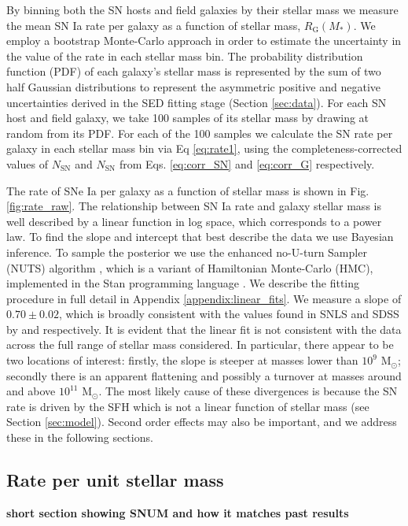 \documentclass[fleqn,usenatbib]{mnras}
\begin{document}
By binning both the SN hosts and field galaxies by their stellar mass we measure the mean SN Ia rate per galaxy as a function of stellar mass, $R_{\mathrm{G}}(M_*)$. We employ a bootstrap Monte-Carlo approach in order to estimate the uncertainty in the value of the rate in each stellar mass bin. The probability distribution function (PDF) of each galaxy's stellar mass is represented by the sum of two half Gaussian distributions to represent the asymmetric positive and negative uncertainties derived in the SED fitting stage (Section \ref{sec:data}). For each SN host and field galaxy, we take 100 samples of its stellar mass by drawing at random from its PDF. For each of the 100 samples we calculate the SN rate per galaxy in each stellar mass bin via Eq \ref{eq:rate1}, using the completeness-corrected values of $N_{\mathrm{SN}}$ and $N_{\mathrm{SN}}$ from Eqs. \ref{eq:corr_SN} and \ref{eq:corr_G} respectively. 

The rate of SNe Ia per galaxy as a function of stellar mass is shown in Fig. \ref{fig:rate_raw}. The relationship between SN Ia rate and galaxy stellar mass is well described by a linear function in log space, which corresponds to a power law. To find the slope and intercept that best describe the data we use Bayesian inference. To sample the posterior we use the enhanced no-U-turn Sampler (NUTS) algorithm \citep{Betancourt2017}, which is a variant of Hamiltonian Monte-Carlo (HMC), implemented in the Stan programming language \citep{Carpenter2017}. We describe the fitting procedure in full detail in Appendix \ref{appendix:linear_fits}. We measure a slope of $0.70\pm0.02$, which is broadly consistent with the values found in SNLS and SDSS by \citet{Sullivan2006} and \citet{Smith2012} respectively. It is evident that the linear fit is not consistent with the data across the full range of stellar mass considered. In particular, there appear to be two locations of interest: firstly, the slope is steeper at masses lower than $10^9$ M$_{\odot}$; secondly there is an apparent flattening and possibly a turnover at masses around and above $10^{11}$ M$_{\odot}$. The most likely cause of these divergences is because the SN rate is driven by the SFH which is not a linear function of stellar mass (see Section \ref{sec:model}). Second order effects may also be important, and we address these in the following sections.

\subsection{Rate per unit stellar mass \label{subsec:snum}}
\textbf{short section showing SNUM and how it matches past results}
\end{document}
